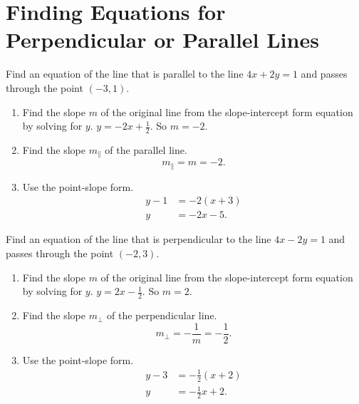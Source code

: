 \documentclass[en,12pt]{elegantbook}
\providecommand{\tightlist}{%
  \setlength{\itemsep}{0pt}\setlength{\parskip}{0pt}}
\newcommand{\parll}{ {\mathbin{\parallel}} }
\providecommand{\tightlist}{%
  \setlength{\itemsep}{0pt}\setlength{\parskip}{0pt}}
\let\BeginKnitrBlock\begin \let\EndKnitrBlock\end
\begin{document}
\hypertarget{finding-equations-for-perpendicular-or-parallel-lines}{%
\section{Finding Equations for Perpendicular or Parallel Lines}\label{finding-equations-for-perpendicular-or-parallel-lines}}

\BeginKnitrBlock{example}
\protect\hypertarget{exm:unnamed-chunk-238}{}{\label{exm:unnamed-chunk-238} }
Find an equation of the line that is parallel to the line \(4x+2y=1\) and passes through the point \((-3, 1)\).
\EndKnitrBlock{example}

\BeginKnitrBlock{solution}


\begin{enumerate}
\def\labelenumi{\arabic{enumi}.}
\tightlist
\item
  Find the slope \(m\) of the original line from the slope-intercept form equation by solving for \(y\). \(y=-2x+\frac12\). So \(m=-2\).
\item
  Find the slope \(m_\parll\) of the parallel line.
  \[m_\parll=m=-2.\]
\item
  Use the point-slope form.
  \[
       \begin{aligned}
           y-1&=-2(x+3)\\
           y&=-2x-5.
       \end{aligned}
   \]
\end{enumerate}
\EndKnitrBlock{solution}

\BeginKnitrBlock{example}
\protect\hypertarget{exm:unnamed-chunk-240}{}{\label{exm:unnamed-chunk-240} }
Find an equation of the line that is perpendicular to the line \(4x-2y=1\) and passes through the point \((-2,3)\).
\EndKnitrBlock{example}

\BeginKnitrBlock{solution}


\begin{enumerate}
\def\labelenumi{\arabic{enumi}.}
\tightlist
\item
  Find the slope \(m\) of the original line from the slope-intercept form equation by solving for \(y\). \(y=2x-\frac12\). So \(m=2\).
\item
  Find the slope \(m_\perp\) of the perpendicular line.
  \[m_\perp=-\frac1m=-\frac12.\]
\item
  Use the point-slope form.
  \[
       \begin{aligned}
           y-3&=-\frac12(x+2)\\
           y&=-\frac{1}{2}x+2.
       \end{aligned}
   \]
\end{enumerate}
\EndKnitrBlock{solution}
\end{document}
